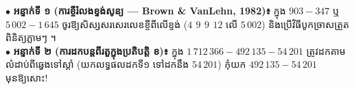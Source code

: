 \documentclass[a4paper,10pt]{article}
\newcommand{\en}[1]{{\TimesEn #1}}
\begin{document}
\begin{tcolorbox}[
  enhanced, sharp corners, colback=panelgray, colframe=black,
  boxrule=0.85pt, boxsep=2.5pt, top=4.5pt, bottom=4.5pt, left=6pt, right=6pt
]
  \fontsize{8.8pt}{13.2pt}\selectfont
  $\bullet$ \textbf{អន្ទាក់ទី ១ (ការខ្ចីរំលងខ្ទង់សូន្យ — \en{Brown \& VanLehn, 1982})៖} ក្នុង $903 - 347$ ឬ $5\,002 - 1\,645$ ចូរឱ្យសិស្សសរសេរលេខខ្ចីពីលើខ្ទង់ ($4\ \,9\ \,9\ \,12$ លើ $5\,002$) និងប្រើវិធីបូកច្រាសត្រួតពិនិត្យភ្លាមៗ ។\\[2.5pt]
  $\bullet$ \textbf{អន្ទាក់ទី ២ (ការដកបន្តពីរតួក្នុងប្រតិបត្តិ ខ)៖} ក្នុង $1\,712\,366 - 492\,135 - 54\,201$ ត្រូវដកតាមលំដាប់ពីឆ្វេងទៅស្ដាំ (យកលទ្ធផលដកទី១ ទៅដកនឹង $54\,201$) កុំយក $492\,135 - 54\,201$ មុនឱ្យសោះ!
\end{tcolorbox}
\end{document}
